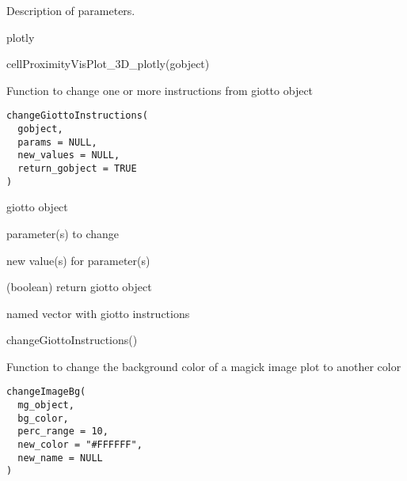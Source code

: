 \documentclass[a4paper]{book}
\begin{document}
%
\begin{Details}\relax
Description of parameters.
\end{Details}
%
\begin{Value}
plotly
\end{Value}
%
\begin{Examples}
\begin{ExampleCode}
    cellProximityVisPlot_3D_plotly(gobject)
\end{ExampleCode}
\end{Examples}
%
\begin{Description}\relax
Function to change one or more instructions from giotto object
\end{Description}
%
\begin{Usage}
\begin{verbatim}
changeGiottoInstructions(
  gobject,
  params = NULL,
  new_values = NULL,
  return_gobject = TRUE
)
\end{verbatim}
\end{Usage}
%
\begin{Arguments}
\begin{ldescription}
\item[\code{gobject}] giotto object

\item[\code{params}] parameter(s) to change

\item[\code{new\_values}] new value(s) for parameter(s)

\item[\code{return\_gobject}] (boolean) return giotto object
\end{ldescription}
\end{Arguments}
%
\begin{Value}
named vector with giotto instructions
\end{Value}
%
\begin{Examples}
\begin{ExampleCode}
    changeGiottoInstructions()
\end{ExampleCode}
\end{Examples}
%
\begin{Description}\relax
Function to change the background color of a magick image plot to another color
\end{Description}
%
\begin{Usage}
\begin{verbatim}
changeImageBg(
  mg_object,
  bg_color,
  perc_range = 10,
  new_color = "#FFFFFF",
  new_name = NULL
)
\end{verbatim}
\end{Usage}
\end{document}
